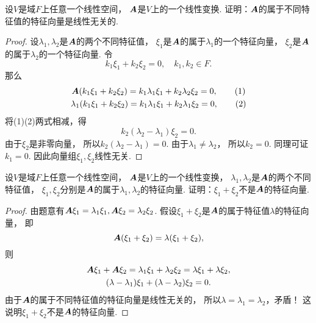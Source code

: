 \begin{example}
设\(V\)是域\(F\)上任意一个线性空间，
\(\boldsymbol{A}\)是\(V\)上的一个线性变换.
证明：\(\boldsymbol{A}\)的属于不同特征值的特征向量是线性无关的.
\begin{proof}
设\(\lambda_1,\lambda_2\)是\(\boldsymbol{A}\)的两个不同特征值，
\(\xi_1\)是\(\boldsymbol{A}\)的属于\(\lambda_1\)的一个特征向量，
\(\xi_2\)是\(\boldsymbol{A}\)的属于\(\lambda_2\)的一个特征向量.
令\[
	k_1 \xi_1 + k_2 \xi_2 = 0,
	\quad k_1,k_2 \in F.
\]
那么\begin{gather*}
	\vb{A}(k_1 \xi_1 + k_2 \xi_2)
	= k_1 \lambda_1 \xi_1 + k_2 \lambda_2 \xi_2
	= 0, \tag1 \\
	\lambda_1(k_1 \xi_1 + k_2 \xi_2)
	= k_1 \lambda_1 \xi_1 + k_2 \lambda_1 \xi_2
	= 0, \tag2
\end{gather*}
将(1)(2)两式相减，得\[
	k_2 (\lambda_2 - \lambda_1) \xi_2 = 0.
\]
由于\(\xi_2\)是非零向量，
所以\(k_2 (\lambda_2 - \lambda_1) = 0\).
由于\(\lambda_1 \neq \lambda_2\)，
所以\(k_2 = 0\).
同理可证\(k_1 = 0\).
因此向量组\(\xi_1,\xi_2\)线性无关.
\end{proof}
\end{example}

\begin{example}
设\(V\)是域\(F\)上任意一个线性空间，
\(\boldsymbol{A}\)是\(V\)上的一个线性变换，
\(\lambda_1,\lambda_2\)是\(\boldsymbol{A}\)的两个不同特征值，
\(\xi_1,\xi_2\)分别是\(\boldsymbol{A}\)的属于\(\lambda_1,\lambda_2\)的特征向量.
证明：\(\xi_1+\xi_2\)不是\(\boldsymbol{A}\)的特征向量.
\begin{proof}
由题意有\(\boldsymbol{A} \xi_1 = \lambda_1 \xi_1,
\boldsymbol{A} \xi_2 = \lambda_2 \xi_2\).
假设\(\xi_1+\xi_2\)是\(\boldsymbol{A}\)的属于特征值\(\lambda\)的特征向量，
即\[
	\boldsymbol{A} (\xi_1 + \xi_2) = \lambda (\xi_1 + \xi_2),
\]
则\begin{gather*}
	\boldsymbol{A} \xi_1 + \boldsymbol{A} \xi_2
	= \lambda_1 \xi_1 + \lambda_2 \xi_2
	= \lambda \xi_1 + \lambda \xi_2, \\
	(\lambda - \lambda_1) \xi_1 + (\lambda - \lambda_2) \xi_2
	= 0.
\end{gather*}
由于\(\boldsymbol{A}\)的属于不同特征值的特征向量是线性无关的，
所以\(\lambda = \lambda_1 = \lambda_2\)，矛盾！
这说明\(\xi_1+\xi_2\)不是\(\boldsymbol{A}\)的特征向量.
\end{proof}
\end{example}


